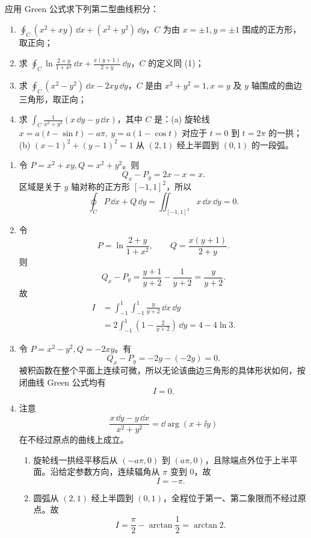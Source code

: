 \begin{xexercise}[1]
应用 Green 公式求下列第二型曲线积分：
\begin{enumerate}[label=(\arabic*)]
  \item $\displaystyle\oint_C(x^2+xy)\,\dd x+(x^2+y^2)\,\dd y$，$C$ 为由 $x=\pm1,y=\pm1$ 围成的正方形，取正向；
  \item 求 $\displaystyle\oint_C\ln\frac{2+y}{1+x^2}\,\dd x+\frac{x(y+1)}{2+y}\,\dd y$，$C$ 的定义同 (1)；
  \item 求 $\displaystyle\oint_C(x^2-y^2)\,\dd x-2xy\,\dd y$，$C$ 是由 $x^2+y^2=1,x=y$ 及 $y$ 轴围成的曲边三角形，取正向；
  \item 求 $\displaystyle\int_C\frac1{x^2+y^2}(x\,\dd y-y\,\dd x)$，其中 $C$ 是：(a) 旋轮线 $x=a(t-\sin t)-a\pi,\ y=a(1-\cos t)$ 对应于 $t=0$ 到 $t=2\pi$ 的一拱；(b) $(x-1)^2+(y-1)^2=1$ 从 $(2,1)$ 经上半圆到 $(0,1)$ 的一段弧。
\end{enumerate}
\end{xexercise}
\begin{xsolution}
\begin{enumerate}[label=(\arabic*)]
\item 令 $P=x^2+xy,Q=x^2+y^2$。则
\[
  Q_x-P_y=2x-x=x.
\]
区域是关于 $y$ 轴对称的正方形 $[-1,1]^2$，所以
\[
  \oint_C P\,\dd x+Q\,\dd y
  =\iint_{[-1,1]^2}x\,\dd x\,\dd y=0.
\]

\item 令
\[
  P=\ln\frac{2+y}{1+x^2},
  \qquad
  Q=\frac{x(y+1)}{2+y}.
\]
则
\[
  Q_x-P_y=\frac{y+1}{y+2}-\frac1{y+2}=\frac y{y+2}.
\]
故
\begin{align*}
  I
  &=\int_{-1}^1\int_{-1}^1\frac y{y+2}\,\dd x\,\dd y\\
  &=2\int_{-1}^1\left(1-\frac2{y+2}\right)\,\dd y
   =4-4\ln3.
\end{align*}

\item 令 $P=x^2-y^2,Q=-2xy$。有
\[
  Q_x-P_y=-2y-(-2y)=0.
\]
被积函数在整个平面上连续可微，所以无论该曲边三角形的具体形状如何，按闭曲线 Green 公式均有
\[
  I=0.
\]

\item 注意
\[
  \frac{x\,\dd y-y\,\dd x}{x^2+y^2}=\dd\arg(x+\ii y)
\]
在不经过原点的曲线上成立。
\begin{enumerate}[label=(\alph*)]
\item 旋轮线一拱经平移后从 $(-a\pi,0)$ 到 $(a\pi,0)$，且除端点外位于上半平面。沿给定参数方向，连续辐角从 $\pi$ 变到 $0$，故
\[
  I=-\pi.
\]
\item 圆弧从 $(2,1)$ 经上半圆到 $(0,1)$，全程位于第一、第二象限而不经过原点。故
\[
  I=\frac\pi2-\arctan\frac12=\arctan2.
\]
\end{enumerate}
\end{enumerate}
\end{xsolution}
